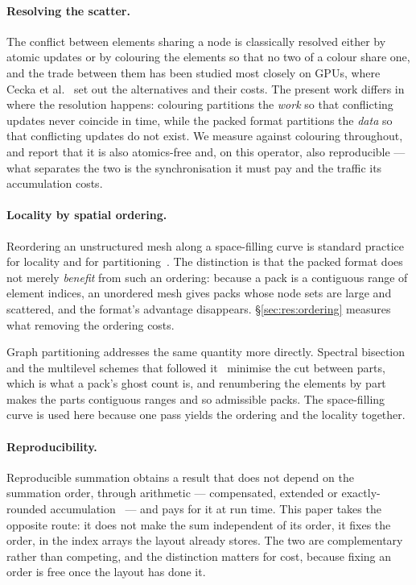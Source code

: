 \documentclass[sigconf,nonacm]{acmart}
\begin{document}
\paragraph{Resolving the scatter.} The conflict between elements sharing a node is classically
resolved either by atomic updates or by colouring the elements so that no two of a colour share
one, and the trade between them has been studied most closely on GPUs, where Cecka et
al.~\cite{CeckaLewDarve2011} set out the alternatives and their costs. The present work differs
in where the resolution happens: colouring partitions the \emph{work} so that conflicting
updates never coincide in time, while the packed format partitions the \emph{data} so that
conflicting updates do not exist. We measure against colouring throughout, and report that it is
also atomics-free and, on this operator, also reproducible --- what separates the two is the
synchronisation it must pay and the traffic its accumulation costs.

\paragraph{Locality by spatial ordering.} Reordering an unstructured mesh along a space-filling
curve is standard practice for locality and for partitioning~\cite{Bader2013,Zumbusch2001}. The
distinction is that the packed format does not merely \emph{benefit} from such an
ordering: because a pack is a contiguous range of element indices, an unordered mesh gives packs
whose node sets are large and scattered, and the format's advantage disappears.
\S\ref{sec:res:ordering} measures what removing the ordering costs.

Graph partitioning addresses the same quantity more directly. Spectral
bisection~\cite{PothenSimonLiou1990} and the multilevel schemes that followed
it~\cite{KarypisKumar1998,PellegriniRoman1996} minimise the cut between parts, which is what a
pack's ghost count is, and renumbering the elements by part makes the parts contiguous ranges and
so admissible packs. The space-filling curve is used here because one pass yields the ordering
and the locality together.

\paragraph{Reproducibility.} Reproducible summation obtains a result that does not depend on the
summation order, through arithmetic --- compensated, extended or exactly-rounded accumulation~\cite{DemmelNguyen2013} ---
and pays for it at run time. This paper takes the opposite route: it does not make the sum
independent of its order, it fixes the order, in the index arrays the layout already stores. The
two are complementary rather than competing, and the distinction matters for cost, because
fixing an order is free once the layout has done it.
\end{document}
